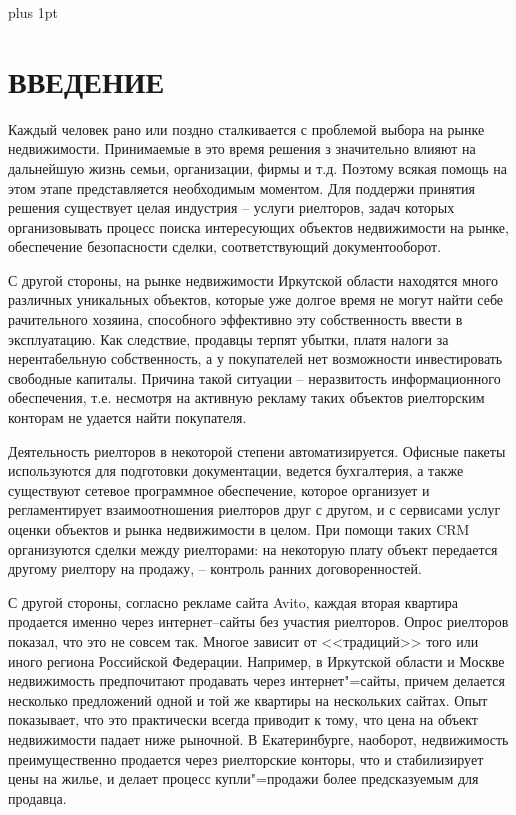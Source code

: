 \documentclass[a4paper,14pt,openany,final]{extreport} %
\date{}
\renewcommand{\chaptername}{}
\renewcommand{\bibname}{Список использованных источников}
\begin{document}
\renewcommand{\bibname}{СПИСОК ИСПОЛЬЗОВАННЫХ ИСТОЧНИКОВ}
\renewcommand{\chaptername}{}
\parskip=0pt plus 1pt

\tableofcontents

\chapter*{ВВЕДЕНИЕ}

Каждый человек рано или поздно сталкивается с проблемой выбора на рынке недвижимости.  Принимаемые в это время решения з значительно влияют на дальнейшую жизнь семьи, организации, фирмы и т.д.
Поэтому всякая помощь на этом этапе представляется необходимым моментом.  Для поддержи принятия решения существует целая индустрия -- услуги риелторов, задач которых организовывать процесс поиска интересующих объектов недвижимости на рынке, обеспечение безопасности сделки, соответствующий документооборот.

С другой стороны, на рынке недвижимости Иркутской области находятся много различных уникальных объектов, которые уже долгое время не могут найти себе рачительного хозяина, способного эффективно эту собственность ввести в эксплуатацию.  Как следствие, продавцы терпят убытки, платя налоги за нерентабельную собственность, а у покупателей нет возможности инвестировать свободные капиталы.  Причина такой ситуации -- неразвитость информационного обеспечения, т.е. несмотря на активную рекламу таких объектов риелторским конторам не удается найти покупателя.

Деятельность риелторов в некоторой степени автоматизируется.  Офисные пакеты используются для подготовки документации, ведется бухгалтерия, а также существуют сетевое программное обеспечение, которое организует и регламентирует взаимоотношения риелторов друг с другом, и с сервисами услуг оценки объектов и рынка недвижимости в целом.  При помощи таких CRM организуются сделки между риелторами: на некоторую плату объект передается другому риелтору на продажу, -- контроль ранних договоренностей.

С другой стороны, согласно рекламе сайта Avito, каждая вторая квартира продается именно через интернет--сайты без участия риелторов.  Опрос риелторов показал, что это не совсем так.  Многое зависит от <<традиций>> того или иного региона Российской Федерации.  Например, в Иркутской области и Москве недвижимость предпочитают продавать через интернет"=сайты, причем делается несколько предложений одной и той же квартиры на нескольких сайтах.  Опыт показывает, что это практически всегда приводит к тому, что цена на объект недвижимости падает ниже рыночной.  В Екатеринбурге, наоборот, недвижимость преимущественно продается через риелторские конторы, что и стабилизирует цены на жилье, и делает процесс купли"=продажи более предсказуемым для продавца.
\end{document}
